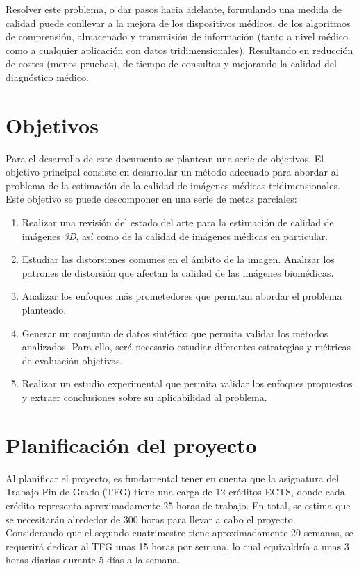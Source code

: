 Resolver este problema, o dar pasos hacia adelante, formulando una medida de calidad
puede conllevar a la mejora de los dispositivos médicos, de los algoritmos de comprensión, almacenado 
y transmisión de información (tanto a nivel médico como a cualquier 
aplicación con datos tridimensionales).
Resultando en reducción de costes (menos pruebas), de tiempo de consultas y 
mejorando la calidad del diagnóstico médico. 

\section{Objetivos}
Para el desarrollo de este documento se plantean una serie de objetivos. 
El objetivo principal consiste en desarrollar un método adecuado para abordar al 
problema de la estimación de la calidad de imágenes médicas tridimensionales. 
Este objetivo se puede descomponer en una serie de metas parciales: 
\begin{enumerate}
  \item Realizar una revisión del estado del arte para la estimación de calidad 
    de imágenes \emph{3D}, así como de la calidad de imágenes médicas en particular.
  \item Estudiar las distorsiones comunes en el ámbito de la imagen. 
    Analizar los patrones de distorsión que afectan la calidad de las imágenes 
    biomédicas.
  \item Analizar los enfoques más prometedores que permitan abordar el problema planteado. 
  \item Generar un conjunto de datos sintético que permita validar 
    los métodos analizados. Para ello, será necesario estudiar diferentes 
    estrategias y métricas de evaluación objetivas\cite{ITU-R.2012, ITU-r.2021, DatasetGeneration}.
  \item Realizar un estudio experimental que permita validar los enfoques 
    propuestos y extraer conclusiones sobre su aplicabilidad al problema. 
\end{enumerate}
\section{Planificación del proyecto}
Al planificar el proyecto, es fundamental tener en cuenta que la asignatura del 
Trabajo Fin de Grado (TFG) tiene una carga de 12 créditos ECTS, donde cada 
crédito representa aproximadamente 25 horas de trabajo. 
En total, se estima que se necesitarán alrededor de 300 horas para llevar a cabo 
el proyecto. Considerando que el segundo cuatrimestre tiene aproximadamente 20 semanas, 
se requerirá dedicar al TFG unas 15 horas por semana, lo cual equivaldría a unas 3 horas 
diarias durante 5 días a la semana.
 
